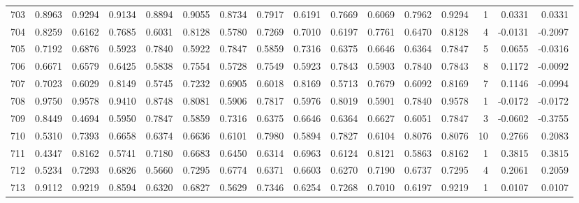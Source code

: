 \begin{tabular}{lrrrrrrrrrrrrrrr}
703 &      0.8963 &  0.9294 &  0.9134 &  0.8894 &  0.9055 &  0.8734 &  0.7917 &  0.6191 &  0.7669 &  0.6069 &   0.7962 &     0.9294 &      1 &                    0.0331 &                     0.0331 \\
704 &      0.8259 &  0.6162 &  0.7685 &  0.6031 &  0.8128 &  0.5780 &  0.7269 &  0.7010 &  0.6197 &  0.7761 &   0.6470 &     0.8128 &      4 &                   -0.0131 &                    -0.2097 \\
705 &      0.7192 &  0.6876 &  0.5923 &  0.7840 &  0.5922 &  0.7847 &  0.5859 &  0.7316 &  0.6375 &  0.6646 &   0.6364 &     0.7847 &      5 &                    0.0655 &                    -0.0316 \\
706 &      0.6671 &  0.6579 &  0.6425 &  0.5838 &  0.7554 &  0.5728 &  0.7549 &  0.5923 &  0.7843 &  0.5903 &   0.7840 &     0.7843 &      8 &                    0.1172 &                    -0.0092 \\
707 &      0.7023 &  0.6029 &  0.8149 &  0.5745 &  0.7232 &  0.6905 &  0.6018 &  0.8169 &  0.5713 &  0.7679 &   0.6092 &     0.8169 &      7 &                    0.1146 &                    -0.0994 \\
708 &      0.9750 &  0.9578 &  0.9410 &  0.8748 &  0.8081 &  0.5906 &  0.7817 &  0.5976 &  0.8019 &  0.5901 &   0.7840 &     0.9578 &      1 &                   -0.0172 &                    -0.0172 \\
709 &      0.8449 &  0.4694 &  0.5950 &  0.7847 &  0.5859 &  0.7316 &  0.6375 &  0.6646 &  0.6364 &  0.6627 &   0.6051 &     0.7847 &      3 &                   -0.0602 &                    -0.3755 \\
710 &      0.5310 &  0.7393 &  0.6658 &  0.6374 &  0.6636 &  0.6101 &  0.7980 &  0.5894 &  0.7827 &  0.6104 &   0.8076 &     0.8076 &     10 &                    0.2766 &                     0.2083 \\
711 &      0.4347 &  0.8162 &  0.5741 &  0.7180 &  0.6683 &  0.6450 &  0.6314 &  0.6963 &  0.6124 &  0.8121 &   0.5863 &     0.8162 &      1 &                    0.3815 &                     0.3815 \\
712 &      0.5234 &  0.7293 &  0.6826 &  0.5660 &  0.7295 &  0.6774 &  0.6371 &  0.6603 &  0.6270 &  0.7190 &   0.6737 &     0.7295 &      4 &                    0.2061 &                     0.2059 \\
713 &      0.9112 &  0.9219 &  0.8594 &  0.6320 &  0.6827 &  0.5629 &  0.7346 &  0.6254 &  0.7268 &  0.7010 &   0.6197 &     0.9219 &      1 &                    0.0107 &                     0.0107 \\

\end{tabular}
